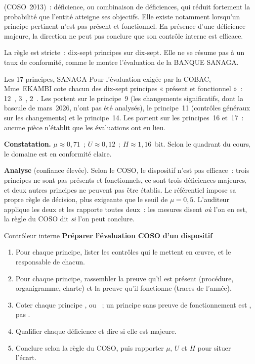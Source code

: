 \begin{boxdef}
 (COSO~2013)~:
déficience, ou combinaison de déficiences, qui réduit fortement la
probabilité que l'entité atteigne ses objectifs. Elle existe notamment
lorsqu'un principe pertinent n'est pas présent et fonctionnel. En présence
d'une déficience majeure, la direction ne peut pas conclure que son
contrôle interne est efficace.
\end{boxdef}

La règle est stricte~: dix-sept principes sur dix-sept. Elle ne se résume
pas à un taux de conformité, comme le montre l'évaluation de la BANQUE
SANAGA.

\begin{boxlecture}{Les 17 principes, SANAGA}
Pour l'évaluation exigée par la COBAC, Mme~EKAMBI cote chacun des dix-sept
principes « présent et fonctionnel »~: 12~\OUI{}, 3~\NON{}, 2~\NEK{}. Les
\NON{} portent sur le principe~9 (les changements significatifs, dont la
bascule de mars~2026, n'ont pas été analysés), le principe~11 (contrôles
généraux sur les changements) et le principe~14. Les \NEK{} portent sur les
principes~16 et~17~: aucune pièce n'établit que les évaluations ont eu lieu.

\medskip
\textbf{Constatation.} $\mu \approx 0{,}71$~; $U \approx 0{,}12$~;
$H \approx 1{,}16$~bit. Selon le quadrant du cours, le domaine est en
conformité claire.

\medskip
\textbf{Analyse} (confiance élevée). Selon le COSO, le dispositif n'est
pas efficace~: trois principes ne sont pas présents et fonctionnels, ce
sont trois déficiences majeures, et deux autres principes ne peuvent pas
être établis. Le référentiel impose sa propre règle de décision, plus
exigeante que le seuil de $\mu = 0{,}5$. L'auditeur applique les deux et
les rapporte toutes deux~: les mesures disent \emph{où} l'on en est, la
règle du COSO dit \emph{si} l'on peut conclure.

\medskip
\hfill{}
\end{boxlecture}

\begin{boxmetier}{Contrôleur interne}
\textbf{Préparer l'évaluation COSO d'un dispositif}
\begin{enumerate}
    \item Pour chaque principe, lister les contrôles qui le mettent en
          œuvre, et le responsable de chacun.
    \item Pour chaque principe, rassembler la preuve qu'il est présent
          (procédure, organigramme, charte) et la preuve qu'il fonctionne
          (traces de l'année).
    \item Coter chaque principe \OUI{}, \NON{} ou \NEK{}~; un principe sans
          preuve de fonctionnement est \NEK{}, pas \OUI{}.
    \item Qualifier chaque déficience et dire si elle est majeure.
    \item Conclure selon la règle du COSO, puis rapporter $\mu$, $U$ et $H$
          pour situer l'écart.
\end{enumerate}
\end{boxmetier}

